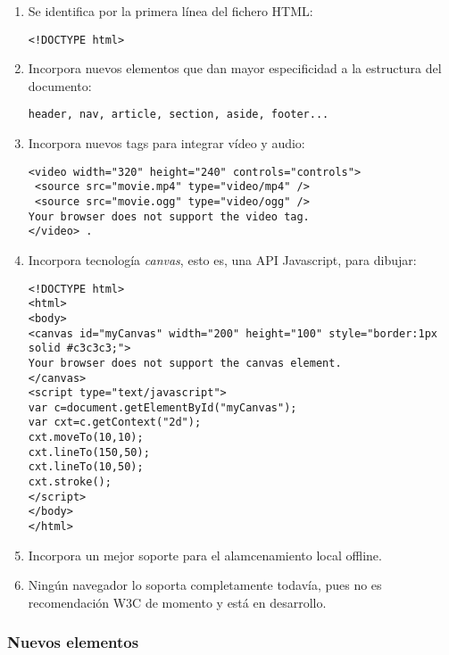 \documentclass{apuntes}
\begin{document}
\begin{enumerate}
\item Se identifica por la primera línea del fichero HTML:
\begin{verbatim}
<!DOCTYPE html> 
\end{verbatim}
\item Incorpora nuevos elementos que dan mayor especificidad a la estructura del documento:
\begin{verbatim}
header, nav, article, section, aside, footer...
\end{verbatim}
\item Incorpora nuevos tags para integrar vídeo y audio:
\begin{verbatim}
<video width="320" height="240" controls="controls"> 
 <source src="movie.mp4" type="video/mp4" /> 
 <source src="movie.ogg" type="video/ogg" /> 
Your browser does not support the video tag. 
</video> .
\end{verbatim}
\item Incorpora tecnología \emph{canvas}, esto es, una API Javascript, para dibujar:

\begin{verbatim}
<!DOCTYPE html> 
<html> 
<body> 
<canvas id="myCanvas" width="200" height="100" style="border:1px solid #c3c3c3;"> 
Your browser does not support the canvas element. 
</canvas> 
<script type="text/javascript"> 
var c=document.getElementById("myCanvas"); 
var cxt=c.getContext("2d"); 
cxt.moveTo(10,10); 
cxt.lineTo(150,50); 
cxt.lineTo(10,50); 
cxt.stroke(); 
</script> 
</body> 
</html> 
\end{verbatim}
\item Incorpora un mejor soporte para el alamcenamiento local offline.
\item Ningún navegador lo soporta completamente todavía, pues no es recomendación W3C de momento y está en desarrollo.
\end{enumerate}
\subsubsection{Nuevos elementos}
\end{document}
